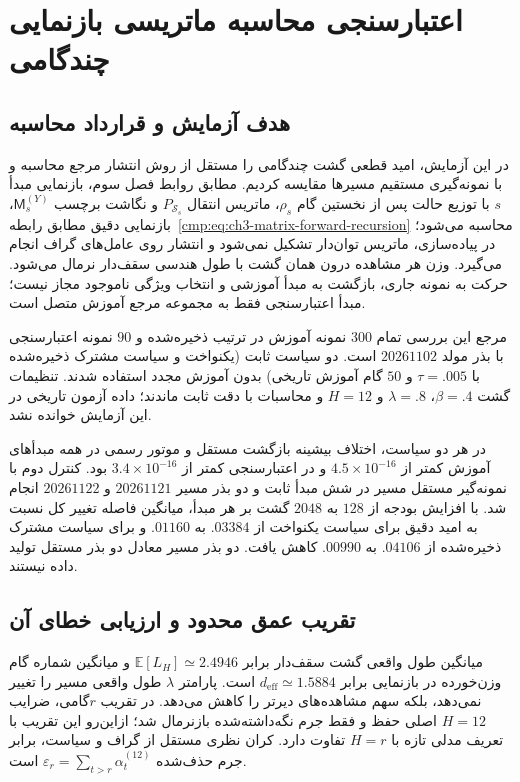 \section{اعتبارسنجی محاسبه ماتریسی بازنمایی چندگامی}
\label{sec:ch4-exact-matrix-evaluation}

\subsection{هدف آزمایش و قرارداد محاسبه}
\label{subsec:ch4-matrix-eval-protocol}
در این آزمایش، امید قطعی گشت چندگامی را مستقل از روش
انتشار مرجع محاسبه و با نمونه‌گیری مستقیم مسیرها مقایسه
کردیم. مطابق روابط فصل سوم، بازنمایی مبدأ $s$ با توزیع
حالت پس از نخستین گام $\rho_s$، ماتریس انتقال $P_{\mathcal S_s}$
و نگاشت برچسب $\mathsf M_s^{(Y)}$،
بازنمایی دقیق مطابق رابطه~\eqref{cmp:eq:ch3-matrix-forward-recursion}
محاسبه می‌شود؛ در پیاده‌سازی، ماتریس توان‌دار تشکیل
نمی‌شود و انتشار روی عامل‌های گراف انجام می‌گیرد.
وزن هر مشاهده درون همان گشت با طول هندسی
سقف‌دار نرمال می‌شود. حرکت به نمونه جاری،
بازگشت به مبدأ آموزشی و انتخاب ویژگی ناموجود
مجاز نیست؛ مبدأ اعتبارسنجی فقط به مجموعه مرجع
آموزش متصل است.

مرجع این بررسی تمام $300$ نمونه آموزش در ترتیب
ذخیره‌شده  و $90$ نمونه اعتبارسنجی
با بذر مولد $20261102$ است. دو سیاست ثابت
(یکنواخت و سیاست مشترک ذخیره‌شده با
$\tau=.005$ و $50$ گام آموزش تاریخی)
بدون آموزش مجدد استفاده شدند.
تنظیمات گشت $\beta=.4$، $\lambda=.8$ و $H=12$
و محاسبات با دقت  ثابت ماندند؛
داده آزمون تاریخی در این آزمایش خوانده نشد.

در هر دو سیاست، اختلاف بیشینه بازگشت مستقل
و موتور رسمی در همه مبدأهای آموزش کمتر از
$4.5\times10^{-16}$ و در اعتبارسنجی کمتر از
$3.4\times10^{-16}$ بود. کنترل دوم با نمونه‌گیر
مستقل مسیر در شش مبدأ ثابت و دو بذر مسیر
$20261121$ و $20261122$ انجام شد.
با افزایش بودجه از $128$ به $2048$ گشت
بر هر مبدأ، میانگین فاصله تغییر کل نسبت
به امید دقیق برای سیاست یکنواخت از $.03384$
به $.01160$ و برای سیاست مشترک ذخیره‌شده
از $.04106$ به $.00990$ کاهش یافت.
دو بذر مسیر معادل دو بذر مستقل تولید داده نیستند.


\subsection{تقریب عمق محدود و ارزیابی خطای آن}
\label{subsec:ch4-matrix-approx}
میانگین طول واقعی گشت سقف‌دار برابر
$\mathbb E[L_H]\simeq2.4946$ و میانگین
شماره گام وزن‌خورده در بازنمایی برابر
$d_{\mathrm{eff}}\simeq1.5884$ است.
پارامتر $\lambda$ طول واقعی مسیر را تغییر
نمی‌دهد، بلکه سهم مشاهده‌های دیرتر را کاهش می‌دهد.
در تقریب $r$گامی، ضرایب $H=12$ اصلی
حفظ و فقط جرم نگه‌داشته‌شده بازنرمال شد؛
ازاین‌رو این تقریب با تعریف مدلی تازه
با $H=r$ تفاوت دارد. کران نظری مستقل
از گراف و سیاست، برابر جرم حذف‌شده
$\varepsilon_r=\sum_{t>r}\alpha_t^{(12)}$
است.

